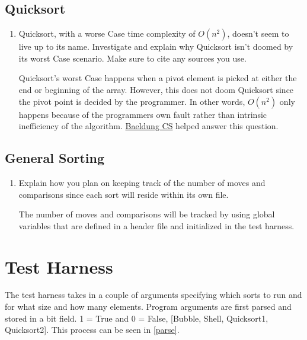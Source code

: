 \documentclass[12pt]{article}
\newenvironment{QandA}{\begin{enumerate}[label=\bfseries\alph*.]\bfseries}
{\end{enumerate}}
\newenvironment{answered}{\par\normalfont}{}
\begin{document}
    \subsection{Quicksort}
    \begin{QandA}
    \item Quicksort, with a worse Case time complexity of $O(n^2)$, doesn’t seem to live up to its name. Investigate and explain why Quicksort isn’t doomed by its worst Case scenario. Make sure to cite any sources you use.
        \begin{answered}
            Quicksort's worst Case happens when a pivot element is picked at either the end or beginning of the array.
			However, this does not doom Quicksort since the pivot point is decided by the programmer.
			In other words, $O(n^2)$ only happens because of the programmers own fault rather than intrinsic inefficiency of the algorithm.
			\href{https://www.baeldung.com/cs/quicksort-time-complexity-worst-Case}{Baeldung CS} helped answer this question.
        \end{answered}


    \end{QandA}

    \subsection{General Sorting}
    \begin{QandA}
    \item Explain how you plan on keeping track of the number of moves and comparisons since each sort will reside within its own file.
        \begin{answered}
            The number of moves and comparisons will be tracked by using global variables that are defined in a header file and initialized in the test harness.
        \end{answered}


    \end{QandA}


    \section{Test Harness}

	The test harness takes in a couple of arguments specifying which sorts to run and for what size and how many elements. Program arguments are first parsed and stored in a bit field. 1 = True and 0 = False, [Bubble, Shell, Quicksort1, Quicksort2]. This process can be seen in \vref{parse}.
\end{document}
